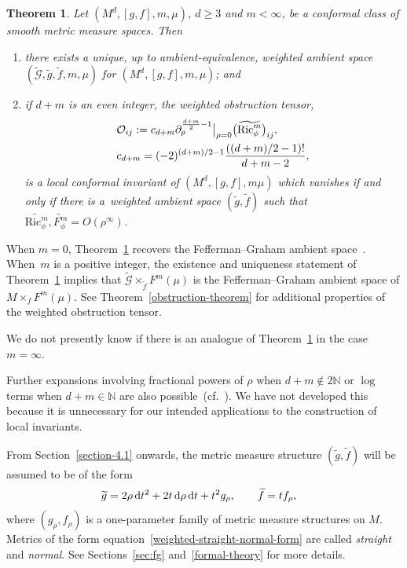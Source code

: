 \documentclass[10pt,a4paper]{amsart}
\newcommand{\cf}{\widetilde{f}}
\newcommand{\cmG}{\widetilde{\mathcal{G}}}
\numberwithin{equation}{section}
\newtheorem{Theorem}{Theorem}[section]
\begin{document}
\begin{Theorem}
 \label{ambient-statement}
Let $(M^d, [g, f], m, \mu)$, $d\geq 3$ and $m<\infty$, be a conformal class of smooth metric measure spaces. Then
\begin{enumerate}[label=$(\roman*)$]\itemsep=0pt
\item there exists a unique, up to ambient-equivalence, weighted ambient space $(\widetilde{\mathcal{G}}, \widetilde{g},\widetilde{f},m,\mu)$ for $(M^d,[g,f],m,\mu)$; and

\item if $d+m$ is an even integer, the weighted obstruction tensor,
\begin{align}
&\mathcal{O}_{ij}:=c_{d+m}\partial_\rho^{\frac{d+m}{2}-1}\big|_{\rho=0} \big(\widetilde{{\rm Ric}_\phi^m}\big)_{ij},\nonumber
\\
&c_{d+m}=(-2)^{(d+m)/2-1}\frac{((d+m)/2-1)!}{d+m-2},\label{obstruction-definition}
\end{align}
is a local conformal invariant of $(M^d,[g,f],m\mu)$ which vanishes if and only if there is a~weighted ambient space $(\widetilde{g},\widetilde{f})$ such that $\widetilde{\mathrm{Ric}_\phi^m},\widetilde{F_\phi^m}=O(\rho^{\infty})$.
\end{enumerate}
\end{Theorem}


When $m=0$, Theorem~\ref{ambient-statement} recovers the Fefferman--Graham ambient space~\cite{FeffermanGraham2012}.
When~$m$ is a positive integer, the existence and uniqueness statement of Theorem~\ref{ambient-statement} implies that $\cmG \times_{\cf} F^m(\mu)$ is the Fefferman--Graham ambient space of $M \times_f F^m(\mu)$. See Theorem~\ref{obstruction-theorem} for additional properties of the weighted obstruction tensor.

We do not presently know if there is an analogue of Theorem~\ref{ambient-statement} in the case $m=\infty$.

Further expansions involving fractional powers of $\rho$ when $d+m\notin 2\mathbb{N}$ or $\log$ terms when $d+m\in\mathbb{N}$ are also possible~(cf.~\cite{FeffermanGraham2012}).
We have not developed this because it is unnecessary for our intended applications to the construction of local invariants.

From Section~\ref{section-4.1} onwards, the metric measure structure $(\widetilde{g},\widetilde{f})$ will be assumed to be of the form
\begin{align}
\label{weighted-straight-normal-form}
&\widetilde{g}=2\rho \,\mathrm{d}t^2+2t \,{\rm d}\rho \,\mathrm{d}t+ t^2 g_\rho,\qquad
\widetilde{f}= tf_\rho,
\end{align}
where $(g_\rho,f_\rho)$ is a one-parameter family of metric measure structures on $M$.
Metrics of the form equation~\eqref{weighted-straight-normal-form} are called \emph{straight} and \emph{normal}. See Sections~\ref{sec:fg} and~\ref{formal-theory} for more details.
\end{document}
